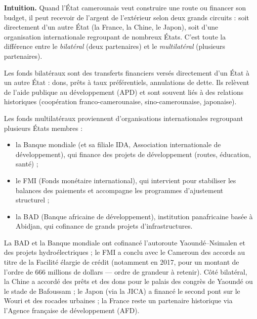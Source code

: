 \documentclass[11pt]{article}
\newcommand{\cle}[1]{{\popxbold\color{popdark}#1}}
\begin{document}
\textbf{Intuition.} Quand l'État camerounais veut construire une route ou financer son budget, il peut recevoir de l'argent de l'extérieur selon deux grands circuits : soit directement d'un autre État (la France, la Chine, le Japon), soit d'une organisation internationale regroupant de nombreux États. C'est toute la différence entre le \emph{bilatéral} (deux partenaires) et le \emph{multilatéral} (plusieurs partenaires).

\begin{definition}
Les \cle{fonds bilatéraux} sont des transferts financiers versés directement d'un État à un autre État : dons, prêts à taux préférentiels, annulations de dette. Ils relèvent de l'\cle{aide publique au développement} (APD) et sont souvent liés à des relations historiques (coopération franco-camerounaise, sino-camerounaise, japonaise).
\par
Les \cle{fonds multilatéraux} proviennent d'organisations internationales regroupant plusieurs États membres :
\begin{itemize}
\item la \cle{Banque mondiale} (et sa filiale IDA, Association internationale de développement), qui finance des projets de développement (routes, éducation, santé) ;
\item le \cle{FMI} (Fonds monétaire international), qui intervient pour stabiliser les balances des paiements et accompagne les programmes d'ajustement structurel ;
\item la \cle{BAD} (Banque africaine de développement), institution panafricaine basée à Abidjan, qui cofinance de grands projets d'infrastructures.
\end{itemize}
\end{definition}

\begin{exemplebox}
La BAD et la Banque mondiale ont cofinancé l'autoroute Yaoundé--Nsimalen et des projets hydroélectriques ; le FMI a conclu avec le Cameroun des accords au titre de la Facilité élargie de crédit (notamment en 2017, pour un montant de l'ordre de 666 millions de dollars — ordre de grandeur à retenir). Côté bilatéral, la Chine a accordé des prêts et des dons pour le palais des congrès de Yaoundé ou le stade de Bafoussam ; le Japon (via la JICA) a financé le second pont sur le Wouri et des rocades urbaines ; la France reste un partenaire historique via l'Agence française de développement (AFD).
\end{exemplebox}
\end{document}
